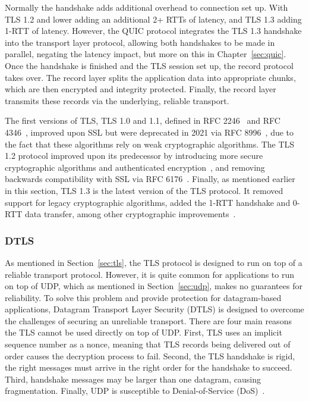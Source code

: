 \documentclass[english, 12pt, a4paper, elec, utf8, a-2b, online]{aaltothesis}
\begin{document}
Normally the handshake adds additional overhead to connection set up. With TLS 1.2 and
lower adding an additional 2+ RTTs of latency, and TLS 1.3 adding 1-RTT of latency.
However, the QUIC protocol integrates the TLS 1.3 handshake into the transport layer protocol,
allowing both handshakes to be made in parallel, negating the latency impact, but more
on this in Chapter~\ref{sec:quic}. Once the handshake is finished and the TLS session set up,
the record protocol takes over. The record layer splits the application data into
appropriate chunks, which are then encrypted and integrity protected. Finally, the record layer transmits
these records via the underlying, reliable transport.

The first versions of TLS, TLS 1.0 and 1.1, defined in RFC 2246~\cite{rfc2246} and
RFC 4346~\cite{rfc4346}, improved upon SSL but were deprecated in 2021 via RFC 8996~\cite{rfc8996},
due to the fact that these algorithms rely on weak cryptographic algorithms. The TLS 1.2
protocol improved upon its predecessor by introducing more secure cryptographic algorithms and
authenticated encryption~\cite{rfc5246}, and removing backwards compatibility with
SSL via RFC 6176~\cite{rfc6176}. Finally, as mentioned earlier in this section,
TLS 1.3 is the latest version of the TLS protocol. It removed support for legacy
cryptographic algorithms, added the 1-RTT handshake and 0-RTT data transfer, among other
cryptographic improvements~\cite{rfc8446}.

\subsubsection{DTLS}

As mentioned in Section~\ref{sec:tls}, the TLS protocol is designed to run on top
of a reliable transport protocol. However, it is quite common for applications to run on top
of UDP, which as mentioned in Section~\ref{sec:udp}, makes no guarantees for reliability.
To solve this problem and provide protection for datagram-based applications,
Datagram Transport Layer Security (DTLS) is designed to overcome the challenges
of securing an unreliable transport. There are four main reasons the TLS cannot
be used directly on top of UDP. First, TLS uses an implicit sequence number as a
nonce, meaning that TLS records being delivered out of order causes the decryption
process to fail. Second, the TLS handshake is rigid, the right messages must arrive
in the right order for the handshake to succeed. Third, handshake messages may be 
larger than one datagram, causing fragmentation. Finally, UDP is susceptible to
Denial-of-Service (DoS)~\cite{rfc9147}.
\end{document}
